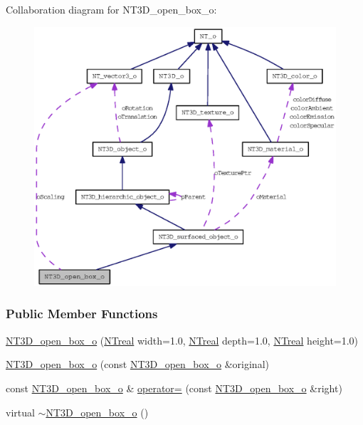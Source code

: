 Collaboration diagram for NT3D\_\-open\_\-box\_\-o:
\nopagebreak
\begin{figure}[H]
\begin{center}
\leavevmode
\includegraphics[width=400pt]{class_n_t3_d__open__box__o__coll__graph}
\end{center}
\end{figure}
\subsubsection*{Public Member Functions}
\begin{DoxyCompactItemize}
\item 
\hyperlink{class_n_t3_d__open__box__o_aa585b81e5034dc70e777f043b05fee85}{NT3D\_\-open\_\-box\_\-o} (\hyperlink{nt__types_8h_a814a97893e9deb1eedcc7604529ba80d}{NTreal} width=1.0, \hyperlink{nt__types_8h_a814a97893e9deb1eedcc7604529ba80d}{NTreal} depth=1.0, \hyperlink{nt__types_8h_a814a97893e9deb1eedcc7604529ba80d}{NTreal} height=1.0)
\item 
\hyperlink{class_n_t3_d__open__box__o_affc565be36a03ba76410e0ce4914945d}{NT3D\_\-open\_\-box\_\-o} (const \hyperlink{class_n_t3_d__open__box__o}{NT3D\_\-open\_\-box\_\-o} \&original)
\item 
const \hyperlink{class_n_t3_d__open__box__o}{NT3D\_\-open\_\-box\_\-o} \& \hyperlink{class_n_t3_d__open__box__o_a1ce042cccd03858860d866a69aef5903}{operator=} (const \hyperlink{class_n_t3_d__open__box__o}{NT3D\_\-open\_\-box\_\-o} \&right)
\item 
virtual \hyperlink{class_n_t3_d__open__box__o_afd85fea95985cb49d074abf087f10ea7}{$\sim$NT3D\_\-open\_\-box\_\-o} ()
\end{DoxyCompactItemize}
